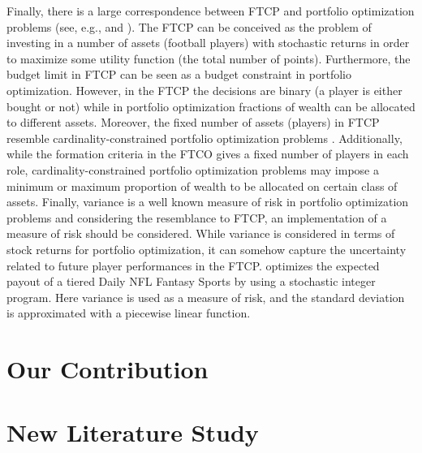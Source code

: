 \newpar

Finally, there is a large correspondence between FTCP and portfolio optimization problems (see, e.g., \cite{Markowitz} and \cite{Speranza}). The FTCP can be conceived as the problem of investing in a number of assets (football players) with stochastic returns in order to maximize some utility function (the total number of points). Furthermore, the budget limit in FTCP can be seen as a budget constraint in portfolio optimization. However, in the FTCP the decisions are binary (a player is either bought or not) while in portfolio optimization fractions of wealth can be allocated to different assets. Moreover, the fixed number of assets (players) in FTCP resemble cardinality-constrained portfolio optimization problems \citep{Chang}. Additionally, while the formation criteria in the FTCO gives a fixed number of players in each role, cardinality-constrained portfolio optimization problems may impose a minimum or maximum proportion of wealth to be allocated on certain class of assets. Finally, variance is a well known measure of risk in portfolio optimization problems and considering the resemblance to FTCP, an implementation of a measure of risk should be considered. While variance is considered in terms of stock returns for portfolio optimization, it can somehow capture the uncertainty related to future player performances in the FTCP. \cite{Dailyfantasysports} optimizes the expected payout of a tiered Daily NFL Fantasy Sports by using a stochastic integer program. Here variance is used as a measure of risk, and the standard deviation is approximated with a piecewise linear function. 

\section{Our Contribution}


\iffalse %


\section{New Literature Study} \label{new} 

